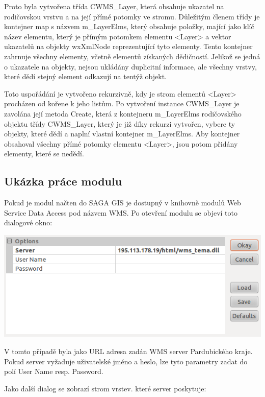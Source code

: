 \documentclass[a4paper,12pt]{article}
\begin{document}
Proto byla vytvořena třída  CWMS\_Layer, která obsahuje ukazatel na rodičovskou vrstvu a na její přímé potomky ve stromu. Důležitým členem třídy je kontejner map s názvem m\_LayerElms, který obsahuje položky, mající jako klíč název elementu, který je přímým potomkem elementu <Layer> a vektor ukazatelů na objekty wxXmlNode reprezentující tyto elementy. Tento kontejner zahrnuje všechny elementy, včetně elementů získaných dědičností. Jelikož se jedná o ukazatele na objekty, nejsou ukládány duplicitní informace, ale všechny vrstvy, které dědí stejný element odkazují na tentýž objekt. 

Toto uspořádání je vytvořeno rekurzivně, kdy je strom elementů <Layer> procházen od kořene k jeho listům. Po vytvoření instance  CWMS\_Layer je zavolána její metoda Create, která z kontejneru m\_LayerElms  rodičovského objektu třídy CWMS\_Layer, který je již díky rekurzi vytvořen, vybere ty objekty, které dědí a naplní vlastní kontejner m\_LayerElms. Aby kontejner obsahoval všechny přímé potomky elementu <Layer>, jsou potom přidány elementy, které se nedědí. 

\subsection{Ukázka práce modulu}

Pokud je modul načten do SAGA GIS je dostupný v knihovně modulů Web Service Data Access pod názvem WMS. Po otevření modulu se objeví toto dialogové okno:

 \includegraphics[scale=0.4]{figures/SAGA_okno1.png}

V tomto případě byla jako URL adresa zadán WMS server Pardubického kraje. 
Pokud server vyžaduje uživatelské jméno a heslo, lze tyto parametry zadat do polí User Name resp. Password. 

Jako další dialog se zobrazí strom vrstev. které server poskytuje:
\end{document}
